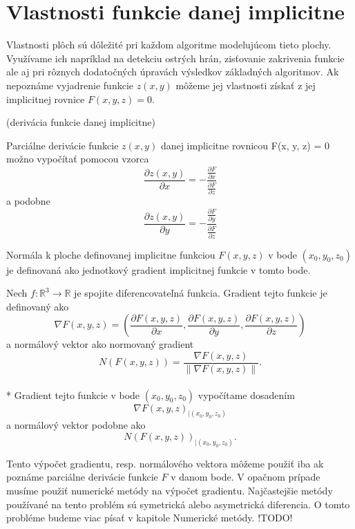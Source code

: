 \newpage

\section{Vlastnosti funkcie danej implicitne}

Vlastnosti plôch sú dôležité pri každom algoritme modelujúcom tieto plochy. Využívame ich napríklad na detekciu ostrých hrán, 
zisťovanie zakrivenia funkcie ale aj pri rôznych dodatočných úpravách výsledkov základných algoritmov.
Ak nepoznáme vyjadrenie funkcie $z(x, y)$ môžeme jej vlastnosti získať z jej implicitnej rovnice $F(x, y, z) = 0$.


\begin{theorem}
    (derivácia funkcie danej implicitne)

    Parciálne derivácie funkcie $z(x, y)$ danej implicitne rovnicou F(x, y, z) = 0 možno vypočítať pomocou vzorca
    $$\frac{\partial z(x, y)}{\partial x} = -\frac{\frac{\partial F}{\partial x}}{\frac{\partial F}{\partial z}}$$
    a podobne 
    $$\frac{\partial z(x, y)}{\partial y} = -\frac{\frac{\partial F}{\partial y}}{\frac{\partial F}{\partial z}}$$
\end{theorem}

Normála k ploche definovanej implicitne funkciou $F(x,y,z)$ v bode $(x_0, y_0, z_0)$ je definovaná ako jednotkový 
gradient implicitnej funkcie  v tomto bode.

\begin{definition}
    Nech $f : \mathbb{R}^3 \to \mathbb{R}$ je spojite diferencovateľná funkcia. Gradient tejto 
    funkcie je definovaný ako 
    $$\nabla F(x, y, z) = (\frac{\partial F(x, y, z)}{\partial x}, \frac{\partial F(x, y, z)}{\partial y}, 
    \frac{\partial F(x, y, z)}{\partial z})$$
    a normálový vektor ako normovaný gradient
    $$N(F(x, y, z))  = \frac{\nabla F(x, y, z)}{\| \nabla F(x, y, z) \|}.$$
    \\*
    Gradient tejto funkcie v bode $(x_0, y_0, z_0)$ vypočítame dosadením $$\nabla F(x, y, z)_{\big|(x_0, y_0, z_0)}$$ 
    a normálový vektor podobne ako $$N(F(x, y, z))_{\big|(x_0, y_0, z_0)}.$$
\end{definition}

Tento výpočet gradientu, resp. normálového vektora môžeme použiť iba ak poznáme parciálne derivácie funkcie $F$ v danom bode.
V opačnom prípade musíme použiť numerické metódy na výpočet gradientu. Najčastejšie metódy používané na tento problém sú 
symetrická alebo asymetrická diferencia. O tomto probléme budeme viac písať v kapitole Numerické metódy. !TODO! 
